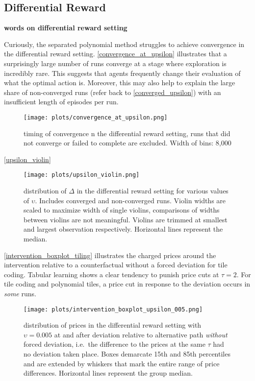 \pagebreak
\subsection{Differential Reward}\label{differential_appendix}

\textbf{words on differential reward setting}

Curiously, the separated polynomial method struggles to achieve convergence in the differential reward setting. \autoref{convergence_at_upsilon} illustrates that a surprisingly large number of runs converge at a stage where exploration is incredibly rare. This suggests that agents frequently change their evaluation of what the optimal action is. Moreover, this may also help to explain the large share of non-converged runs (refer back to \autoref{converged_upsilon}) with an insufficient length of episodes per run.

\begin{figure}
	\texttt{[image: plots/convergence\_at\_upsilon.png]}
	\caption{timing of convergence n the differential reward setting, runs that did not converge or failed to complete are excluded. Width of bins: 8,000}
	\label{convergence_at_upsilon}
\end{figure}


\autoref{upsilon_violin}

\begin{figure}
	\texttt{[image: plots/upsilon\_violin.png]}
	\caption{distribution of $\Delta$ in the differential reward setting for various values of $\upsilon$. Includes converged and non-converged runs. Violin widths are scaled to maximize width of single violins, comparisons of widths between violins are not meaningful. Violins are trimmed at smallest and largest observation respectively. Horizontal lines represent the median.}
	\label{upsilon_violin}
\end{figure}

\autoref{intervention_boxplot_tiling} illustrates the charged prices around the intervention relative to a counterfactual without a forced deviation for tile coding. Tabular learning shows a clear tendency to punish price cuts at $\tau = 2$. For tile coding and polynomial tiles, a price cut in response to the deviation occurs in \emph{some} runs.

\begin{figure}
	\texttt{[image: plots/intervention\_boxplot\_upsilon\_005.png]}
	\caption{distribution of prices in the differential reward setting with $\upsilon = 0.005$ at and after deviation relative to alternative path \emph{without} forced deviation, i.e.\ the difference to the prices at the same $\tau$ had no deviation taken place. Boxes demarcate 15th and 85th percentiles and are extended by whiskers that mark the entire range of price differences. Horizontal lines represent the group median.}
	\label{intervention_boxplot_tiling}
\end{figure}